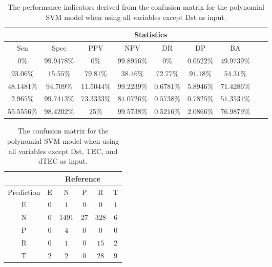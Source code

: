 \begin{table}[!ht]
	\centering
	\begin{tabular}{|c|c|c|c|c|c|c|c|c|}
		\hline
		 & \multicolumn{7}{c|}{Statistics} \\ \hline
		Sen & Spec & PPV & NPV & DR & DP & BA \\ \hline
		$0\%$ & $99.9478\%$ & $0\%$ & $99.8956\%$ & $0\%$ & $0.0522\%$ & $49.9739\%$ \\ \hline
		$93.06\%$ & $15.55\%$ & $79.81\%$ & $38.46\%$ & $72.77\%$ & $91.18\%$ & $54.31\%$ \\ \hline
		$48.1481\%$ & $94.709\%$ & $11.5044\%$ & $99.2239\%$ & $0.6781\%$ & $5.8946\%$ & $71.4286\%$ \\ \hline
		$2.965\%$ & $99.7413\%$ & $73.3333\%$ & $81.0726\%$ & $0.5738\%$ & $0.7825\%$ & $51.3531\%$ \\ \hline
		$55.5556\%$ & $98.4202\%$ & $25\%$ & $99.5738\%$ & $0.5216\%$ & $2.0866\%$ & $76.9879\%$ \\ \hline
	\end{tabular}
	\caption{The performance indicators derived from the confusion matrix for the polynomial SVM model when using all variables except Dst as input.}
	\label{tab:cs:noDst:svmPoly}
\end{table}

\begin{table}[!ht]
	\centering
	\begin{tabular}{|c|c|c|c|c|c|}
		\hline
		 & \multicolumn{5}{|c|}{Reference} \\ \hline
		 Prediction & E & N & P & R & T \\ \hline
		 E & $0$ & $1$ & $0$ & $0$ & $1$ \\ \hline
		 N & $0$ & $1491$ & $27$ & $328$ & $6$ \\ \hline
		 P & $0$ & $4$ & $0$ & $0$ & $0$ \\ \hline
		 R & $0$ & $1$ & $0$ & $15$ & $2$ \\ \hline
		 T & $2$ & $2$ & $0$ & $28$ & $9$ \\ \hline
	\end{tabular}
	\caption{The confusion matrix for the polynomial SVM model when using all variables except Dst, TEC, and dTEC as input.}
	\label{tab:cm:noTEC:svmPoly}
\end{table}

